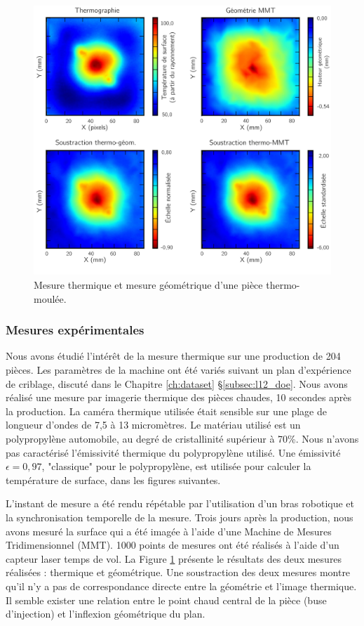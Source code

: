 \begin{figure}[tbp]
	\centering
	\includegraphics[width=\textwidth]{../Chap2/Figures/Comparaison_thermo_MMT.jpg}
	\caption{Mesure thermique et mesure géométrique d'une pièce thermo-moulée.}
	\label{fig:thermo_geom}
\end{figure}

\subsubsection{Mesures expérimentales}
Nous avons étudié l'intérêt de la mesure thermique sur une production de 204 pièces.
Les paramètres de la machine ont été variés suivant un plan d'expérience de criblage, discuté dans le Chapitre \ref{ch:dataset} §\ref{subsec:l12_doe}.
Nous avons réalisé une mesure par imagerie thermique des pièces chaudes, 10 secondes après la production.
La caméra thermique utilisée était sensible sur une plage de longueur d'ondes de 7,5 à 13 micromètres.
Le matériau utilisé est un polypropylène automobile, au degré de cristallinité supérieur à 70\%.
Nous n'avons pas caractérisé l'émissivité thermique du polypropylène utilisé.
Une émissivité $\epsilon=0,97$, "classique" pour le polypropylène, est utilisée pour calculer la température de surface, dans les figures suivantes.

L'instant de mesure a été rendu répétable par l'utilisation d'un bras robotique et la synchronisation temporelle de la mesure.
Trois jours après la production, nous avons mesuré la surface qui a été imagée à l'aide d'une Machine de Mesures Tridimensionnel (MMT).
1000 points de mesures ont été réalisés à l'aide d'un capteur laser temps de vol.
La Figure \ref{fig:thermo_geom} présente le résultats des deux mesures réalisées : thermique et géométrique.
Une soustraction des deux mesures montre qu'il n'y a pas de correspondance directe entre la géométrie et l'image thermique.
Il semble exister une relation entre le point chaud central de la pièce (buse d'injection) et l'inflexion géométrique du plan.

